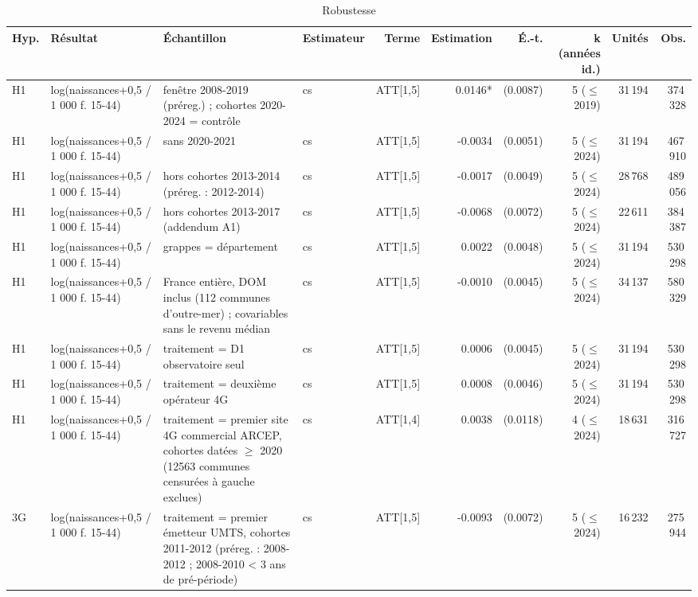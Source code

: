 \begin{table}\centering
\begin{threeparttable}
\caption{Robustesse}\label{tab:robust}
\scriptsize
\begin{tabular}{lp{4.3cm}p{7.5cm}lrrrrrr}
\toprule
Hyp. & Résultat & Échantillon & Estimateur & Terme & Estimation & É.-t. & k (années id.) & Unités & Obs. \\
\midrule
H1 & log(naissances+0,5 / 1 000 f. 15-44) & fenêtre 2008-2019 (préreg.) ; cohortes 2020-2024 = contrôle & cs & ATT[1,5] & 0.0146* & (0.0087) & 5 ($\leq$ 2019) & 31\,194 & 374\,328 \\
H1 & log(naissances+0,5 / 1 000 f. 15-44) & sans 2020-2021 & cs & ATT[1,5] & -0.0034 & (0.0051) & 5 ($\leq$ 2024) & 31\,194 & 467\,910 \\
H1 & log(naissances+0,5 / 1 000 f. 15-44) & hors cohortes 2013-2014 (préreg. : 2012-2014) & cs & ATT[1,5] & -0.0017 & (0.0049) & 5 ($\leq$ 2024) & 28\,768 & 489\,056 \\
H1 & log(naissances+0,5 / 1 000 f. 15-44) & hors cohortes 2013-2017 (addendum A1) & cs & ATT[1,5] & -0.0068 & (0.0072) & 5 ($\leq$ 2024) & 22\,611 & 384\,387 \\
H1 & log(naissances+0,5 / 1 000 f. 15-44) & grappes = département & cs & ATT[1,5] & 0.0022 & (0.0048) & 5 ($\leq$ 2024) & 31\,194 & 530\,298 \\
H1 & log(naissances+0,5 / 1 000 f. 15-44) & France entière, DOM inclus (112 communes d'outre-mer) ; covariables sans le revenu médian & cs & ATT[1,5] & -0.0010 & (0.0045) & 5 ($\leq$ 2024) & 34\,137 & 580\,329 \\
H1 & log(naissances+0,5 / 1 000 f. 15-44) & traitement = D1 observatoire seul & cs & ATT[1,5] & 0.0006 & (0.0045) & 5 ($\leq$ 2024) & 31\,194 & 530\,298 \\
H1 & log(naissances+0,5 / 1 000 f. 15-44) & traitement = deuxième opérateur 4G & cs & ATT[1,5] & 0.0008 & (0.0046) & 5 ($\leq$ 2024) & 31\,194 & 530\,298 \\
H1 & log(naissances+0,5 / 1 000 f. 15-44) & traitement = premier site 4G commercial ARCEP, cohortes datées $\geq$ 2020 (12563 communes censurées à gauche exclues) & cs & ATT[1,4] & 0.0038 & (0.0118) & 4 ($\leq$ 2024) & 18\,631 & 316\,727 \\
3G & log(naissances+0,5 / 1 000 f. 15-44) & traitement = premier émetteur UMTS, cohortes 2011-2012 (préreg. : 2008-2012 ; 2008-2010 < 3 ans de pré-période) & cs & ATT[1,5] & -0.0093 & (0.0072) & 5 ($\leq$ 2024) & 16\,232 & 275\,944 \\

\end{tabular}
\end{threeparttable}
\end{table}
